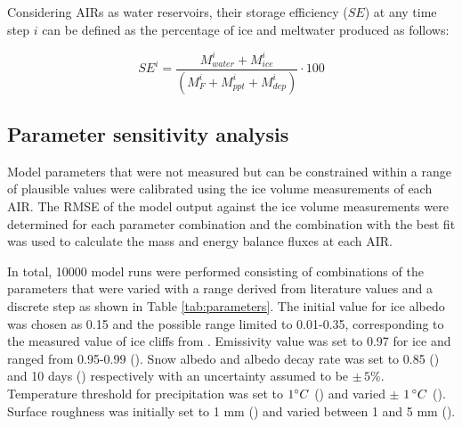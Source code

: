 \documentclass[utf8]{frontiersSCNS} %
\begin{document}
 Considering AIRs as water reservoirs, their storage efficiency ($SE$) at any time step $i$ can be defined as the
 percentage of ice and meltwater produced as follows:

\begin{equation} \textit{SE}^i = \frac{M_{water}^i+M_{ice}^i}{(M_F^i+M_{ppt}^i+M_{dep}^i)} \cdot 100 \end{equation}

\subsection{Parameter sensitivity analysis}
Model parameters that were not measured but can be constrained within a range of plausible values were calibrated using
the ice volume measurements of each AIR. The RMSE of the model output against the ice volume measurements were
determined for each parameter combination and the combination with the best fit was used to calculate the mass and
energy balance fluxes at each AIR. 

In total, 10000 model runs were performed consisting of combinations of the parameters that were varied with a range
derived from literature values and a discrete step as shown in Table \ref{tab:parameters}. The initial value for ice
albedo was chosen as 0.15 and the possible range limited to 0.01-0.35, corresponding to the measured value of ice cliffs
from \cite{steiner_2015}. Emissivity value was set to 0.97 for ice and ranged from 0.95-0.99 (\cite{steiner_2015}). Snow
albedo and albedo decay rate was set to 0.85 (\cite{CuffeyPaterson_2010}) and 10 days (\cite{Schmidt_2017}) respectively
with an uncertainty assumed to be $\pm \,5 \%$. Temperature threshold for precipitation was set to $1 \degree C$
(\cite{FujitaAgeta_2000}) and varied $\pm$ $1\,\degree C$ (\cite{Zhou_2010}).  Surface roughness was initially set to 1
mm (\cite{pellicciotti_2005}) and varied between 1 and 5 mm (\cite{BrockWillisSharp_2006}). 
\end{document}
